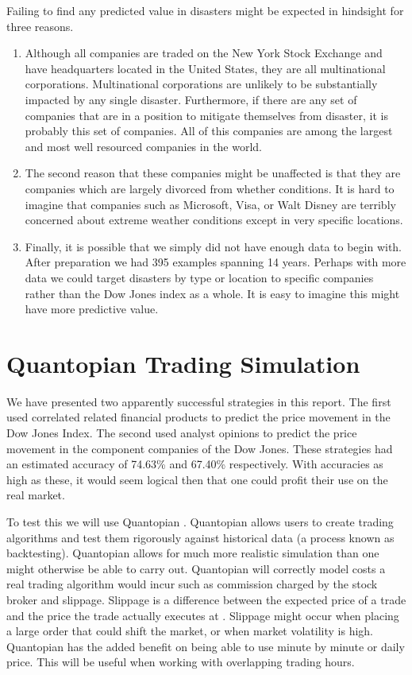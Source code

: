 \documentclass{report}
\begin{document}
Failing to find any predicted value in disasters might be expected in hindsight for three reasons.

\begin{enumerate}
  \item Although all companies are traded on the New York Stock Exchange and have headquarters located in the United States, they are all multinational corporations. Multinational corporations are unlikely to be substantially impacted by any single disaster. Furthermore, if there are any set of companies that are in a position to mitigate themselves from disaster, it is probably this set of companies. All of this companies are among the largest and most well resourced companies in the world.
  
  \item The second reason that these companies might be unaffected is that they are companies which are largely divorced from whether conditions. It is hard to imagine that companies such as Microsoft, Visa, or Walt Disney are terribly concerned about extreme weather conditions except in very specific locations.
  
  \item Finally, it is possible that we simply did not have enough data to begin with. After preparation we had 395 examples spanning 14 years. Perhaps with more data we could target disasters by type or location to specific companies rather than the Dow Jones index as a whole. It is easy to imagine this might have more predictive value.
  
\end{enumerate}

\chapter{Quantopian Trading Simulation}

We have presented two apparently successful strategies in this report. The first used correlated related financial products to predict the price movement in the Dow Jones Index. The second used analyst opinions to predict the price movement in the component companies of the Dow Jones. These strategies had an estimated accuracy of 74.63\% and 67.40\% respectively. With accuracies as high as these, it would seem logical then that one could profit their use on the real market.

To test this we will use Quantopian \cite{quantopian}. Quantopian allows users to create trading algorithms and test them rigorously against historical data (a process known as backtesting). Quantopian allows for much more realistic simulation than one might otherwise be able to carry out. Quantopian will correctly model costs a real trading algorithm would incur such as commission charged by the stock broker and slippage. Slippage is a difference between the expected price of a trade and the price the trade actually executes at \cite{slippage}. Slippage might occur when placing a large order that could shift the market, or when market volatility is high. Quantopian has the added benefit on being able to use minute by minute or daily price. This will be useful when working with overlapping trading hours.
\end{document}

